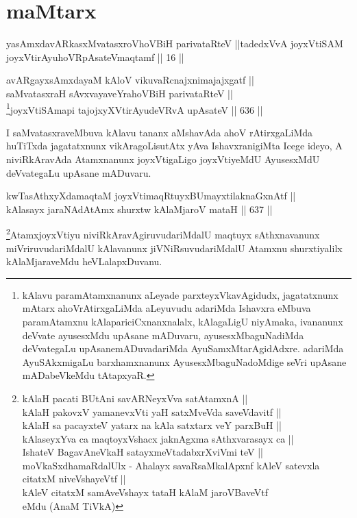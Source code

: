 
\section*{maMtarx}

\begin{shl}
yasAmxdavARkasxMvatasxroV\s hoVBiH parivataRteV ||tadedxVvA joyxVtiSAM joyxVtirAyuhoVRpAsateV\s maqtamf || 16 ||
\end{shl}


\begin{shl}
avARgayxsAmxdayaM kAloV vikuvaRcnajxnimajajxgatf || \\
saMvatasxraH sAvxvayaveYrahoVBiH parivataRteV || \\
\footnote{kAlavu paramAtamxnanunx aLeyade parxteyxVkavAgidudx,
jagatatxnunx mAtarx ahoVrAtirxgaLiMda aLeyuvudu adariMda Ishavxra
eMbuva paramAtamxnu kAlapariciCxnanxnalalx, kAlagaLigU niyAmaka,
ivananunx deVvate ayusesxMdu upAsane mADuvaru, ayusesxMbaguNadiMda
deVvategaLu upAsanemADuvadariMda AyuSamxMtarAgidAdxre. adariMda
AyuSAkxmigaLu barxhamxnanunx AyusesxMbaguNadoMdige seVri upAsane
mADabeVkeMdu tAtapxyaR.}joyxVtiSAmapi tajojxyXVtirAyudeVRvA upAsateV \hfill || 636 ||  
\end{shl}


\begin{artha}
I saMvatasxraveMbuva kAlavu tananx aMshavAda ahoV
rAtirxgaLiMda huTiTxda jagatatxnunx vikAragoLisutAtx yAva
IshavxranigiMta Icege ideyo, A niviRkAravAda Atamxnanunx joyxVtigaLigo
joyxVtiyeMdU AyusesxMdU deVvategaLu upAsane mADuvaru.
\end{artha}



\begin{shl}
kwTasAthxyXdamaqtaM joyxVtimaqRtuyxBUmayxtilaknaGxnAtf ||  \\
kAlasayx jaraNAdAtAmx shurxtw kAlaMjaroV mataH \hfill || 637 ||  
\end{shl}

\begin{artha}
\footnote{kAlaH pacati BUtAni savARNeyxVva satA\s \s tamxnA ||\\
kAlaH pakovxV yamanevxVti yaH satxMveVda saveVdavitf ||\\
kAlaH sa pacayxteV yatarx na kAla satxtarx veY parxBuH ||\\
kAlaseyxYva ca maqtoyxVshacx jaknAgxma sAthxvarasayx ca ||\\
IshateV BagavAneVkaH satayxmeVtadabxrXviVmi teV || moVkaSxdhamaRdalUlx - Ahalayx savaRsaMkalApxnf kAleV satevxla citatxM niveVshayeVtf ||\\
kAleV citatxM samAveVshayx tataH kAlaM jaroVBaveVtf \\
 eMdu (AnaM TiVkA)}AtamxjoyxVtiyu niviRkAravAgiruvudariMdalU maqtuyx
sAthxnavanunx miVriruvudariMdalU kAlavanunx jiVNiRsuvudariMdalU
Atamxnu shurxtiyalilx kAlaMjaraveMdu heVLalapxDuvanu.
\end{artha}


